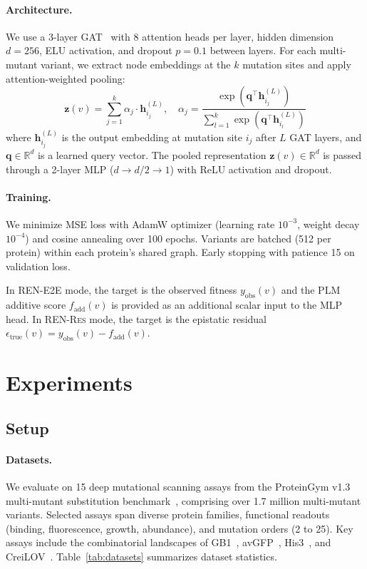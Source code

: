 \documentclass{article}
\newcommand{\rene}{\textsc{REN-E2E}}
\newcommand{\renr}{\textsc{REN-Res}}
\begin{document}
\paragraph{Architecture.} We use a 3-layer GAT~\citep{velickovic2018graph} with 8 attention heads per layer, hidden dimension $d = 256$, ELU activation, and dropout $p = 0.1$ between layers. For each multi-mutant variant, we extract node embeddings at the $k$ mutation sites and apply attention-weighted pooling:
\begin{equation}
    \mathbf{z}(v) = \sum_{j=1}^{k} \alpha_j \cdot \mathbf{h}_{i_j}^{(L)}, \quad \alpha_j = \frac{\exp(\mathbf{q}^\top \mathbf{h}_{i_j}^{(L)})}{\sum_{l=1}^{k} \exp(\mathbf{q}^\top \mathbf{h}_{i_l}^{(L)})}
\end{equation}
where $\mathbf{h}_{i_j}^{(L)}$ is the output embedding at mutation site $i_j$ after $L$ GAT layers, and $\mathbf{q} \in \mathbb{R}^d$ is a learned query vector. The pooled representation $\mathbf{z}(v) \in \mathbb{R}^d$ is passed through a 2-layer MLP ($d \to d/2 \to 1$) with ReLU activation and dropout.

\paragraph{Training.} We minimize MSE loss with AdamW optimizer (learning rate $10^{-3}$, weight decay $10^{-4}$) and cosine annealing over 100 epochs. Variants are batched (512 per protein) within each protein's shared graph. Early stopping with patience 15 on validation loss.

In \rene{} mode, the target is the observed fitness $y_\text{obs}(v)$ and the PLM additive score $f_\text{add}(v)$ is provided as an additional scalar input to the MLP head. In \renr{} mode, the target is the epistatic residual $\epsilon_\text{true}(v) = y_\text{obs}(v) - f_\text{add}(v)$.

\section{Experiments}
\label{sec:experiments}

\subsection{Setup}

\paragraph{Datasets.} We evaluate on 15 deep mutational scanning assays from the ProteinGym v1.3 multi-mutant substitution benchmark~\citep{notin2024proteingym}, comprising over 1.7 million multi-mutant variants. Selected assays span diverse protein families, functional readouts (binding, fluorescence, growth, abundance), and mutation orders (2 to 25). Key assays include the combinatorial landscapes of GB1~\citep{olson2014comprehensive, wu2016adaptation}, avGFP~\citep{sarkisyan2016local}, His3~\citep{pokusaeva2019experimental}, and CreiLOV~\citep{chen2023creilov}. Table~\ref{tab:datasets} summarizes dataset statistics.
\end{document}
